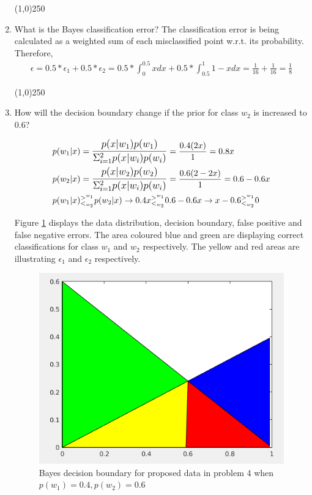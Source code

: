 \documentclass[12pt]{article}
\newcommand{\gl}{^{>^{w_1}}_{<_{w_2}}}
\begin{document}
\begin{enumerate}
\begin{center}
\line(1,0){250}
\end{center}

\item What is the Bayes classification error?
The classification error is being calculated as a weighted sum of each misclassified point w.r.t. its probability. Therefore,
\begin{align*}
\epsilon = 0.5 * \epsilon_1 + 0.5 * \epsilon_2 = 0.5 * \int_0^0.5 x dx + 0.5 * \int_0.5^1 1-x dx = \frac{1}{16} + \frac{1}{16}  = \frac{1}{8}
\end{align*}
\begin{center}
\line(1,0){250}
\end{center}

\item How will the decision boundary change if the prior for class $w_2$ is increased to 0.6?


\begin{align*}
&p(w_1 | x) = \mathlarger{\frac{p(x|w_1) p(w_1)}{\Sigma_{i=1}^2p(x|w_i) p(w_i)}} = \frac{0.4(2x)}{1} = 0.8x\\
&p(w_2 | x) = \mathlarger{\frac{p(x|w_2) p(w_2)}{\Sigma_{i=1}^2p(x|w_i) p(w_i)}} = \frac{0.6(2 - 2x)}{1} = 0.6 - 0.6x\\
&p(w_1|x)\gl p(w_2|x) \rightarrow 0.4x\gl 0.6-0.6x \rightarrow x - 0.6\gl 0
\end{align*}


Figure \ref{fig:4-2} displays the data distribution, decision boundary, false positive and false negative errors. The area coloured blue and green are displaying correct classifications for class $w_1$ and $w_2$ respectively. The yellow and red areas are illustrating $\epsilon_1$ and $\epsilon_2$ respectively.

\begin{figure}[h]
\centering
\includegraphics[scale=0.4]{Imgs/4-2.png}
\caption{Bayes decision boundary for proposed data in problem 4 when $p(w_1) = 0.4, p(w_2) = 0.6$}
\label{fig:4-2}
\end{figure}




\end{enumerate}
\end{document}
